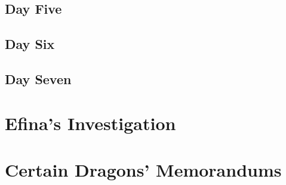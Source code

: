 \documentclass[13pt]{extarticle}
\begin{document}
	\subsection*{Day Five}


	\subsection*{Day Six}

	\subsection*{Day Seven}

	
	\section{Efina’s Investigation}
	
	\section{Certain Dragons’ Memorandums}
	
	
\end{document}
